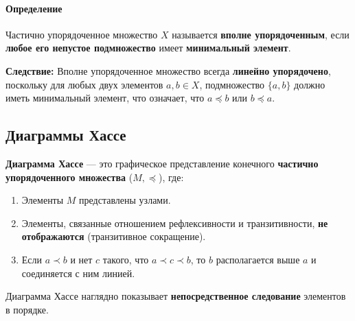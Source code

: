 \paragraph{Определение}
Частично упорядоченное множество $X$ называется \textbf{вполне упорядоченным}, если \textbf{любое его непустое подмножество} имеет \textbf{минимальный элемент}.

\textbf{Следствие:} Вполне упорядоченное множество всегда \textbf{линейно упорядочено}, поскольку для любых двух элементов $a, b \in X$, подмножество $\{a, b\}$ должно иметь минимальный элемент, что означает, что $a \preceq b$ или $b \preceq a$.

\subsection*{Диаграммы Хассе}

\textbf{Диаграмма Хассе} --- это графическое представление конечного \textbf{частично упорядоченного множества} ($M, \preceq$), где:
\begin{enumerate}
    \item Элементы $M$ представлены узлами.
    \item Элементы, связанные отношением рефлексивности и транзитивности, \textbf{не отображаются} (транзитивное сокращение).
    \item Если $a \prec b$ и нет $c$ такого, что $a \prec c \prec b$, то $b$ располагается выше $a$ и соединяется с ним линией.
\end{enumerate}
Диаграмма Хассе наглядно показывает \textbf{непосредственное следование} элементов в порядке.